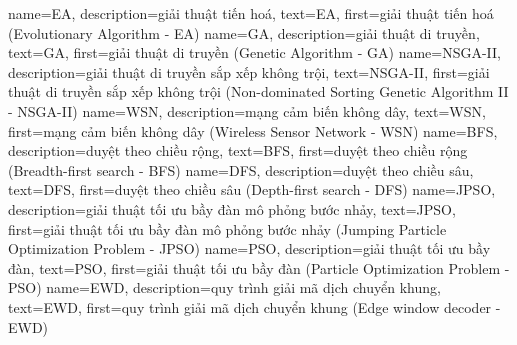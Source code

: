 {
	name=EA,
	description={giải thuật tiến hoá},
	text={EA},
	first={giải thuật tiến hoá (Evolutionary Algorithm - EA)}
}
{
	name=GA,
	description={giải thuật di truyền},
	text={GA},
	first={giải thuật di truyền (Genetic Algorithm - GA)}
}
{
	name=NSGA-II,
	description={giải thuật di truyền sắp xếp không trội},
	text={NSGA-II},
	first={giải thuật di truyền sắp xếp không trội (Non-dominated Sorting Genetic Algorithm II - NSGA-II)}
}
{
	name=WSN,
	description={mạng cảm biến không dây},
	text={WSN},
	first={mạng cảm biến không dây (Wireless Sensor Network - WSN)}
}
{
	name=BFS,
	description={duyệt theo chiều rộng},
	text={BFS},
	first={duyệt theo chiều rộng (Breadth-first search - BFS)}
}
{
	name=DFS,
	description={duyệt theo chiều sâu},
	text={DFS},
	first={duyệt theo chiều sâu (Depth-first search - DFS)}
}
{
	name=JPSO,
	description={giải thuật tối ưu bầy đàn mô phỏng bước nhảy},
	text={JPSO},
	first={giải thuật tối ưu bầy đàn mô phỏng bước nhảy (Jumping Particle Optimization Problem - JPSO)}
}
{
	name=PSO,
	description={giải thuật tối ưu bầy đàn},
	text={PSO},
	first={giải thuật tối ưu bầy đàn (Particle Optimization Problem - PSO)}
}
{
	name=EWD,
	description={quy trình giải mã dịch chuyển khung},
	text={EWD},
	first={quy trình giải mã dịch chuyển khung (Edge window decoder - EWD)}
}